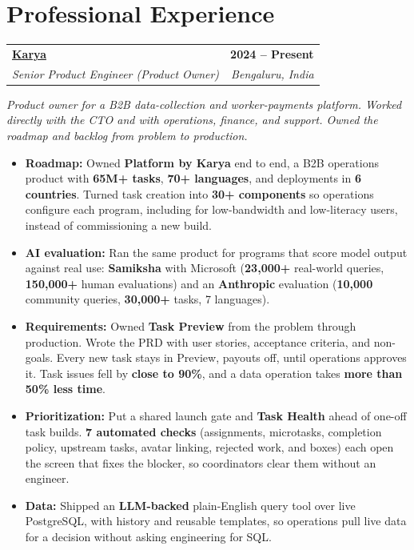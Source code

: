 \documentclass[letterpaper,11pt]{article}
\makeatletter
\newcommand{\entry}[4]{%
  \begin{tabularx}{\linewidth}{@{}X@{}r@{}}
    \textbf{#1} & \textbf{#4} \\
    \textit{#2} & \textit{#3} \\
  \end{tabularx}%
  \vspace{1pt}
}
\makeatother
\begin{document}
\section{Professional Experience}

\entry{\href{https://karya.in}{Karya}}{Senior Product Engineer (Product Owner)}{Bengaluru, India}{2024 -- Present}
{\small\textit{Product owner for a B2B data-collection and worker-payments platform. Worked directly with the CTO and with operations, finance, and support. Owned the roadmap and backlog from problem to production.}}
\begin{itemize}
  \item \textbf{Roadmap:} Owned \textbf{Platform by Karya} end to end, a B2B operations product with \textbf{65M+ tasks}, \textbf{70+ languages}, and deployments in \textbf{6 countries}. Turned task creation into \textbf{30+ components} so operations configure each program, including for low-bandwidth and low-literacy users, instead of commissioning a new build.
  \item \textbf{AI evaluation:} Ran the same product for programs that score model output against real use: \textbf{Samiksha} with Microsoft (\textbf{23,000+} real-world queries, \textbf{150,000+} human evaluations) and an \textbf{Anthropic} evaluation (\textbf{10,000} community queries, \textbf{30,000+} tasks, 7 languages).
  \item \textbf{Requirements:} Owned \textbf{Task Preview} from the problem through production. Wrote the PRD with user stories, acceptance criteria, and non-goals. Every new task stays in Preview, payouts off, until operations approves it. Task issues fell by \textbf{close to 90\%}, and a data operation takes \textbf{more than 50\% less time}.
  \item \textbf{Prioritization:} Put a shared launch gate and \textbf{Task Health} ahead of one-off task builds. \textbf{7 automated checks} (assignments, microtasks, completion policy, upstream tasks, avatar linking, rejected work, and boxes) each open the screen that fixes the blocker, so coordinators clear them without an engineer.
  \item \textbf{Data:} Shipped an \textbf{LLM-backed} plain-English query tool over live PostgreSQL, with history and reusable templates, so operations pull live data for a decision without asking engineering for SQL.
\end{itemize}
\end{document}
